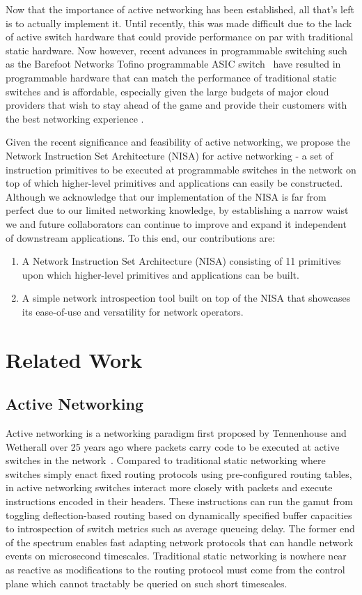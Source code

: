 Now that the importance of active networking has been established, all that's left is to actually implement it. Until recently, this was made difficult due to the lack of active switch hardware that could provide performance on par with traditional static hardware. Now however, recent advances in programmable switching such as the Barefoot Networks Tofino programmable ASIC switch~\cite{tofino} have resulted in programmable hardware that can match the performance of traditional static switches and is affordable, especially given the large budgets of major cloud providers that wish to stay ahead of the game and provide their customers with the best networking experience \cite{p4}.

Given the recent significance and feasibility of active networking, we propose the Network Instruction Set Architecture (NISA) for active networking - a set of instruction primitives to be executed at programmable switches in the network on top of which higher-level primitives and applications can easily be constructed. Although we acknowledge that our implementation of the NISA is far from perfect due to our limited networking knowledge, by establishing a narrow waist we and future collaborators can continue to improve and expand it independent of downstream applications. To this end, our contributions are:
\begin{enumerate}
    \item A Network Instruction Set Architecture (NISA) consisting of 11 primitives upon which higher-level primitives and applications can be built.
    \item A simple network introspection tool built on top of the NISA that showcases its ease-of-use and versatility for network operators.
\end{enumerate}

\section{Related Work}
\subsection{Active Networking}
Active networking is a networking paradigm first proposed by Tennenhouse and Wetherall over 25 years ago where packets carry code to be executed at active switches in the network~\cite{active}. Compared to traditional static networking where switches simply enact fixed routing protocols using pre-configured routing tables, in active networking switches interact more closely with packets and execute instructions encoded in their headers. These instructions can run the gamut from toggling deflection-based routing based on dynamically specified buffer capacities to introspection of switch metrics such as average queueing delay. The former end of the spectrum enables fast adapting network protocols that can handle network events on microsecond timescales. Traditional static networking is nowhere near as reactive as modifications to the routing protocol must come from the control plane which cannot tractably be queried on such short timescales.   

